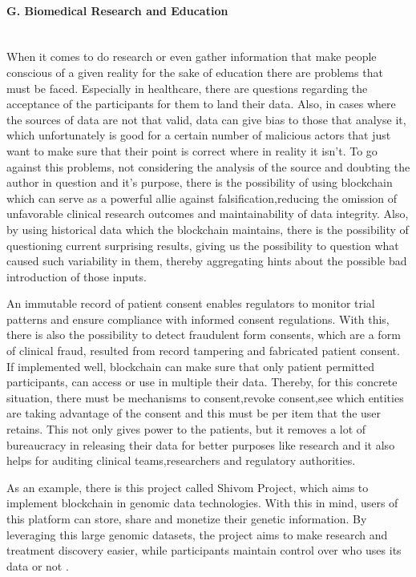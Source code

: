 \paragraph{G. Biomedical Research and Education} \mbox{}\\
When it comes to do research or even gather information that make people conscious of a given reality for the sake of education there 
are problems that must be faced. Especially in healthcare, there are questions regarding the acceptance of the participants for them to 
land their data. Also, in cases where the sources of data are not that valid, data can give bias to those that analyse it, which 
unfortunately is good for a certain number of malicious actors that just want to make sure that their point is correct where in 
reality it isn't. To go against this problems, not considering the analysis of the source and doubting the author in question and 
it's purpose, there is the possibility of using blockchain which can serve as a powerful allie against falsification,reducing the omission 
of unfavorable clinical research outcomes and maintainability of data integrity. Also, by using historical data which the blockchain 
maintains, there is the possibility of questioning current surprising results, giving us the possibility to question what caused such 
variability in them, thereby aggregating hints about the possible bad introduction of those inputs. 

An immutable record of patient consent enables regulators to monitor trial patterns and ensure compliance with informed consent 
regulations. With this, there is also the possibility to detect fraudulent form consents, which are a form of clinical fraud, resulted 
from record tampering and fabricated patient consent. If implemented well, blockchain can make sure that only patient permitted 
participants, can access or use in multiple their data. Thereby, for this concrete situation, there must be mechanisms to consent,revoke 
consent,see which entities are taking advantage of the consent and this must be per item that the user retains. This not only gives power 
to the patients, but it removes a lot of bureaucracy in releasing their data for better purposes like research and it also helps for 
auditing clinical teams,researchers and regulatory authorities.

As an example, there is this project called Shivom Project, which aims to implement blockchain in genomic data technologies. With this in 
mind, users of this platform can store, share and monetize their genetic information. By leveraging this large genomic datasets, the project 
aims to make research and treatment discovery easier, while participants maintain control over who uses its data or not \cite{crunchbase}. 

